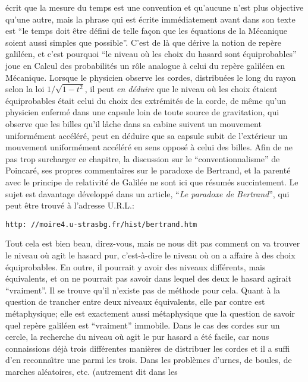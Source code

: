 \'ecrit que la mesure du temps est  une convention et qu'aucune n'est 
plus objective qu'une autre, mais la phrase qui est \'ecrite 
imm\'ediatement avant dans son texte est ``le temps doit \^etre d\'efini 
de telle fa\c con  que les \'equations de la M\'ecanique soient aussi 
simples que possible''.  
\medskip 
C'est de l\`a que d\'erive  la notion de rep\`ere galil\'een, et c'est  
pourquoi ``le niveau o\`u les choix du hasard sont \'equiprobables'' joue en 
Calcul des probabilit\'es un r\^ole analogue \`a celui du rep\`ere galil\'een 
en M\'ecanique. Lorsque le physicien observe les cordes, distribu\'ees le 
long du rayon selon la loi $1 \bigl/\sqrt{1-t^2}$, il peut {\it en d\'eduire} 
que le niveau o\`u les choix \'etaient \'equiprobables \'etait celui du choix 
des extr\'emit\'es de la corde, de m\^eme qu'un physicien enferm\'e dans 
une capsule loin de toute source de gravitation, qui observe que les billes 
qu'il l\^ache dans sa cabine suivent un mouvement uniform\'ement 
acc\'el\'er\'e, peut en d\'eduire  que sa capsule subit de l'ext\'erieur un 
mouvement uniform\'ement  acc\'el\'er\'e en sens oppos\'e \`a celui des 
billes.  
\medskip
Afin de ne pas trop surcharger ce chapitre, la discussion sur le 
``conventionnalisme'' de Poincar\'e, ses propres commentaires sur le 
paradoxe de Bertrand, et la parent\'e avec le principe de relativit\'e de
Galil\'ee ne sont ici que r\'esum\'es succintement. Le sujet est davantage 
d\'evelopp\'e dans un article, ``{\it Le paradoxe de Bertrand}'', qui 
peut \^etre trouv\'e \`a l'adresse U.R.L.:
\smallskip
\centerline{\tt http: //moire4.u-strasbg.fr/hist/bertrand.htm}
\medskip  
Tout cela est bien beau, direz-vous, mais ne nous dit pas comment on va 
trouver le niveau o\`u agit le hasard pur, c'est-\`a-dire le niveau o\`u on 
a affaire \`a des choix \'equiprobables. En outre, il pourrait y avoir des 
niveaux diff\'erents, mais \'equivalents, et on ne pourrait pas savoir 
dans lequel des deux le hasard agirait ``vraiment''.   
\medskip 
Il se trouve qu'il n'existe pas de m\'ethode pour cela. Quant \`a la 
question de trancher entre deux niveaux \'equivalents, elle par contre 
est m\'etaphysique; elle est exactement aussi m\'etaphysique que la 
question de savoir quel rep\`ere galil\'een est  ``vraiment'' immobile. 
Dans le cas des cordes sur un cercle, la recherche  du niveau o\`u agit 
le pur hasard a \'et\'e facile, car nous connaissions d\'ej\`a trois 
diff\'erentes mani\`eres  de distribuer les cordes et il a suffi d'en 
reconna\^\i tre une parmi les trois. Dans les probl\`emes d'urnes, de 
boules, de marches al\'eatoires, etc. (autrement dit dans les 
